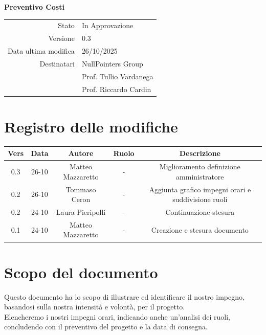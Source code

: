 \documentclass{article}
\begin{document}
	\vspace{2cm}
	
	{
		\centering
		\Huge\bfseries Preventivo Costi\par
		\vspace{0.5cm}
	}
	
	\begin{center}
		\begin{tabular}{r|l}
			Stato & In Approvazione \\
			Versione & 0.3 \\
			Data ultima modifica & 26/10/2025 \\
			Destinatari & NullPointers Group \\
			& Prof. Tullio Vardanega \\
			& Prof. Riccardo Cardin \\
		\end{tabular}
	\end{center}
	
	\newpage
	\section{Registro delle modifiche}
	
	\begin{table}[htbp]
		\begin{tabular}{|c|c|c|c|c|}
			\hline
			\rowcolor[gray]{0.9}
			Vers & Data & Autore & Ruolo & Descrizione \\
			\hline
			0.3 & 26-10 & Matteo Mazzaretto & - & Miglioramento definizione amministratore  \\ 
			\hline
			0.2 & 26-10 & Tommaso Ceron & - & Aggiunta grafico impegni orari e suddivisione ruoli\\
			\hline
			0.2 & 24-10 & Laura Pieripolli & - & Continuazione stesura \\
			\hline
			0.1 & 24-10 & Matteo Mazzaretto & - & Creazione e stesura documento \\
			\hline
		\end{tabular}
	\end{table}
	
	\newpage
	
	\section{Scopo del documento}
	Questo documento ha lo scopo di illustrare ed identificare il nostro impegno, basandosi sulla nostra intensità e volontà, per il progetto.\\
	Elencheremo i nostri impegni orari, indicando anche un'analisi dei ruoli, concludendo con il preventivo del progetto e la data di consegna.\\
	\begin{center}
		
	\end{center}
	
\end{document}
